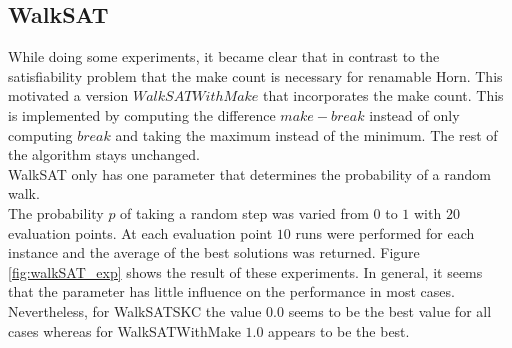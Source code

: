 \documentclass[12pt,a4paper]{article}
\begin{document}
\subsection{WalkSAT} \label{s:walkSATexp}
While doing some experiments, it became clear that in contrast to the satisfiability problem that the make count is necessary for renamable Horn. This motivated a version $WalkSATWithMake$ that incorporates the make count. This is implemented by computing the difference $make - break$ instead of only computing $break$ and taking the maximum instead of the minimum. The rest of the algorithm stays unchanged.\\
WalkSAT only has one parameter that determines the probability of a random walk. \\
The probability $p$ of taking a random step was varied from $0$ to $1$ with $20$ evaluation points. At each evaluation point $10$ runs were performed for each instance and the average of the best solutions was returned. 
Figure \ref{fig:walkSAT_exp} shows the result of these experiments. In general, it seems that the parameter has little influence on the performance in most cases.  Nevertheless, for WalkSATSKC the value $0.0$ seems to be the best value for all cases whereas for WalkSATWithMake $1.0$ appears to be the best. 
\end{document}
